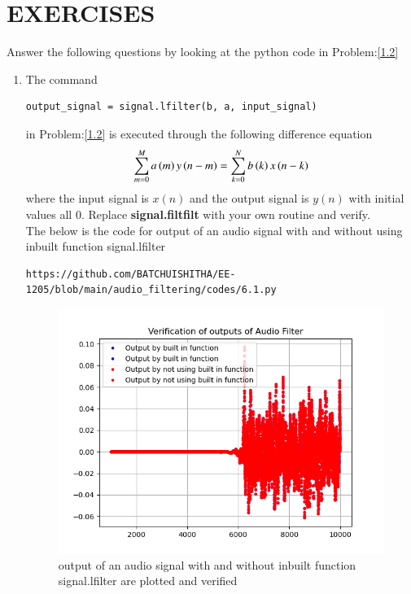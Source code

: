 \documentclass[journal,12pt,twocolumn]{IEEEtran}
\theoremstyle{remark}
\begin{document}
\section{EXERCISES}
Answer the following questions by looking at the python code in Problem:\eqref{1.2}
\begin{enumerate}[label=\thesection.\arabic*]
\item The command
\begin{lstlisting}
output_signal = signal.lfilter(b, a, input_signal)
\end{lstlisting}
in Problem:\eqref{1.2}  is executed through the following difference equation
\begin{equation}
 \sum _{m=0}^{M}a\left(m\right)y\left(n-m\right)=\sum _{k=0}^{N}b\left(k\right)x\left(n-k\right) \label{6.1}
\end{equation}
where the input signal is $x(n)$ and the output signal is $y(n)$ with initial values all 0. Replace
\textbf{signal.filtfilt} with your own routine and verify.\\
\solution The below is the code for output of an audio signal with and without using inbuilt function signal.lfilter\\
\begin{lstlisting}
https://github.com/BATCHUISHITHA/EE-1205/blob/main/audio_filtering/codes/6.1.py
\end{lstlisting}
\begin{figure}[ht]
	\centering
	\includegraphics[width=\columnwidth]{figs/6.1.png}
	\caption{output of an audio signal with and without inbuilt function signal.lfilter are plotted and verified}
	\label{fig:6.1}
\end{figure}

\end{enumerate}
\end{document}
